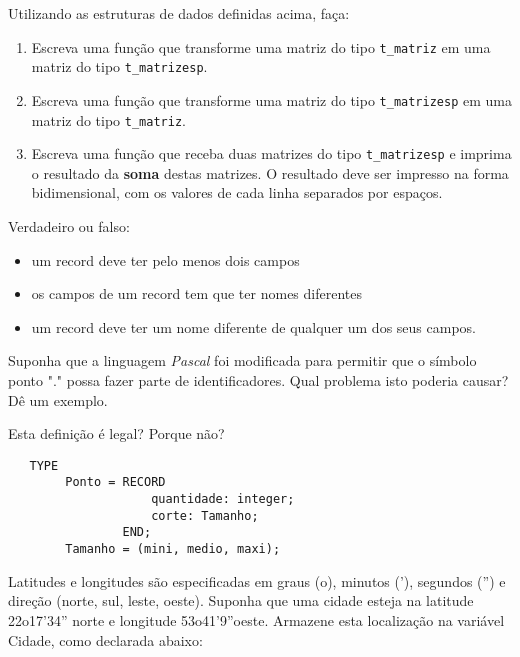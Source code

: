 Utilizando as estruturas de dados definidas acima, faça:
\begin {enumerate}

\item  Escreva uma função que transforme uma matriz do tipo
\verb|t_matriz| em uma matriz do tipo \verb|t_matrizesp|.

\item  Escreva uma função que transforme uma matriz do tipo
\verb|t_matrizesp| em uma matriz do tipo \verb|t_matriz|.
 
\item  Escreva uma função que receba duas matrizes do tipo 
\verb|t_matrizesp| e imprima o resultado da \textbf{soma} destas matrizes. O
resultado deve ser impresso na forma bidimensional, com os valores de cada
linha separados por espaços.

\end{enumerate}

\item Verdadeiro ou falso: 
\begin{itemize}
   \item  um record deve ter pelo menos dois campos
   \item  os campos de um record tem que ter nomes diferentes
   \item  um record deve ter um nome diferente de qualquer um dos seus campos.
\end{itemize}

\item Suponha que a linguagem \emph{Pascal} foi modificada para permitir que o 
   símbolo ponto "." possa fazer parte de identificadores. Qual problema
   isto poderia causar? Dê um exemplo.

\item Esta definição é legal? Porque não? 

\begin{verbatim}
   TYPE 
        Ponto = RECORD
                    quantidade: integer;
                    corte: Tamanho;
                END;
        Tamanho = (mini, medio, maxi);
\end{verbatim}

\item 
 Latitudes e  longitudes são especificadas em graus  (o), minutos ('),
   segundos ('') e direção (norte, sul, leste, oeste). Suponha que uma
   cidade   esteja   na    latitude   22o17'34''   norte   e   longitude
   53o41'9''oeste.  Armazene esta localização  na variável  Cidade, como
   declarada abaixo:
    
